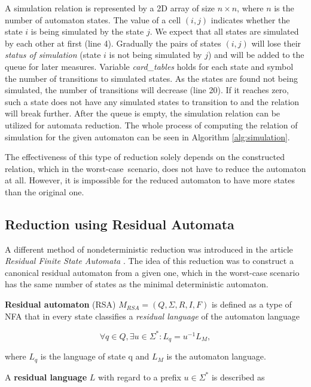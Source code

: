 A simulation relation is represented by a 2D array of size $n\times n$, where $n$ is the number of automaton states. The value of a cell $(i,j)$ indicates whether the state $i$ is being simulated by the state $j$. We expect that all states are simulated by each other at first (line 4). Gradually the pairs of states $(i,j)$ will lose their \textit{status of simulation} (state $i$ is not being simulated by $j$) and will be added to the queue for later measures. Variable \textit{card\_tables} holds for each state and symbol the number of transitions to simulated states. As the states are found not being simulated, the number of transitions will decrease (line 20). If it reaches zero, such a state does not have any simulated states to transition to and the relation will break further. After the queue is empty, the simulation relation can be utilized for automata reduction. The whole process of computing the relation of simulation for the given automaton can be seen in Algorithm \ref{alg:simulation}.

The effectiveness of this type of reduction solely depends on the constructed relation, which in the worst-case scenario, does not have to reduce the automaton at all. However, it is impossible for the reduced automaton to have more states than the original one.

\pagebreak
\subsection{Reduction using Residual Automata}

A different method of nondeterministic reduction was introduced in the article \textit{Residual Finite State Automata} \cite{Denis2001}. The idea of this reduction was to construct a canonical residual automaton from a given one, which in the worst-case scenario has the same number of states as the minimal deterministic automaton. 

\textbf{Residual automaton} (RSA) $M_{RSA}=(Q, \Sigma, R, I, F)$ is defined as a type of NFA that in every state classifies a \textit{residual language} of the automaton language

\begin{equation*}
{\forall q \in Q, \exists u \in \Sigma^*: L_q = u^{-1}L_M},
\end{equation*}

where $L_q$ is the language of state q and $L_M$ is the automaton language.

A \textbf{residual language} $L$ with regard to a prefix $u \in \Sigma^*$ is described as 


